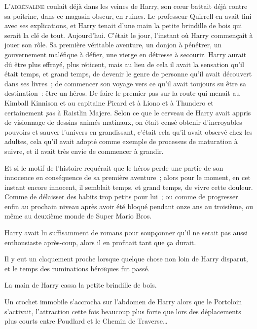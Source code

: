 
\lettrine{L}{'adrénaline} coulait déjà dans les veines de Harry, son cœur battait déjà contre sa poitrine, dans ce magasin obscur, en ruines. Le professeur Quirrell en avait fini avec ses explications, et Harry tenait d'une main la petite brindille de bois qui serait la clé de tout. Aujourd'hui. C'était le jour, l'instant où Harry commençait à jouer son rôle. Sa première véritable aventure, un donjon à pénétrer, un gouvernement maléfique à défier, une vierge en détresse à secourir. Harry aurait dû être plus effrayé, plus réticent, mais au lieu de cela il avait la sensation qu'il était temps, et grand temps, de devenir le genre de personne qu'il avait découvert dans ses livres~; de commencer son voyage vers ce qu'il avait toujours su être sa destination~: être un héros. De faire le premier pas sur la route qui menait au Kimball Kinnison et au capitaine Picard et à Liono et à Thundero et certainement \emph{pas} à Raistlin Majere. Selon ce que le cerveau de Harry avait appris de visionnage de dessins animés matinaux, on était censé obtenir d'incroyables pouvoirs et sauver l'univers en grandissant, c'était cela qu'il avait observé chez les adultes, cela qu'il avait adopté comme exemple de processus de maturation à suivre, et il avait très envie de commencer à grandir.

Et si le motif de l'histoire requérait que le héros perde une partie de son innocence en conséquence de sa première aventure~; alors pour le moment, en cet instant encore innocent, il semblait temps, et grand temps, de vivre cette douleur. Comme de délaisser des habits trop petits pour lui~; ou comme de progresser enfin au prochain niveau après avoir été bloqué pendant onze ans au troisième, ou même au deuxième monde de Super Mario Bros.

Harry avait lu suffisamment de romans pour soupçonner qu'il ne serait pas aussi enthousiaste après-coup, alors il en profitait tant que ça durait.

Il y eut un claquement proche lorsque quelque chose non loin de Harry disparut, et le temps des ruminations héroïques fut passé.

La main de Harry cassa la petite brindille de bois.

Un crochet immobile s'accrocha sur l'abdomen de Harry alors que le Portoloin s'activait, l'attraction cette fois beaucoup plus forte que lors des déplacements plus courts entre Poudlard et le Chemin de Traverse…

